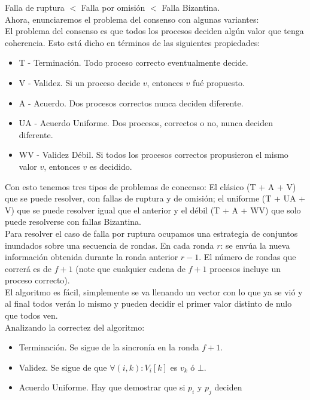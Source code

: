 \documentclass{article}
\begin{document}
\begin{enumerate}
{       Falla de ruptura $<$ Falla por omisión $<$ Falla Bizantina.\\
       Ahora, enunciaremos el problema del consenso con algunas variantes:\\
       El problema del consenso es que todos los procesos deciden algún valor que
       tenga coherencia. Esto está dicho en términos de las siguientes propiedades:\\
       \begin{itemize}
        \item { T - Terminación. Todo proceso correcto eventualmente decide. }
        \item { V - Validez. Si un proceso decide $v$, entonces $v$ fué propuesto. }
        \item { A - Acuerdo. Dos procesos correctos nunca deciden diferente. }
        \item { UA - Acuerdo Uniforme. Dos procesos, correctos o no, nunca deciden
        diferente. }
        \item { WV - Validez Débil. Si todos los procesos correctos propusieron
        el mismo valor $v$, entonces $v$ es decidido. }
      \end{itemize}
      Con esto tenemos tres tipos de problemas de concenso: El clásico (T + A + V)
      que se puede resolver, con fallas de ruptura y de omisión; el uniforme (T + UA + 
      V) que se puede resolver igual que el anterior y el débil (T + A + WV) que solo
      puede resolverse con fallas Bizantina.\\
      Para resolver el caso de falla por ruptura ocupamos una estrategia de conjuntos
      inundados sobre una secuencia de rondas. En cada ronda $r$: se envúa la nueva
      información obtenida durante la ronda anterior $r - 1$. El número de rondas
      que correrá es de $f + 1$ (note que cualquier cadena de $f + 1$ procesos incluye
      un proceso correcto).\\
      El algoritmo es fácil, simplemente se va llenando un vector con lo que ya se vió
      y al final todos verán lo mismo y pueden decidir el primer valor distinto de nulo
      que todos ven.\\
      Analizando la correctez del algoritmo:
      \begin{itemize}
        \item { Terminación. Se sigue de la sincronía en la ronda $f + 1$. }
        \item { Validez. Se sigue de que $\forall(i, k): V_{i}[k]$ es $v_{k}$ ó
        $\bot$. }
        \item { Acuerdo Uniforme. Hay que demostrar que si $p_{i}$ y $p_{j}$ deciden
}
\end{itemize}}
\end{enumerate}
\end{document}
